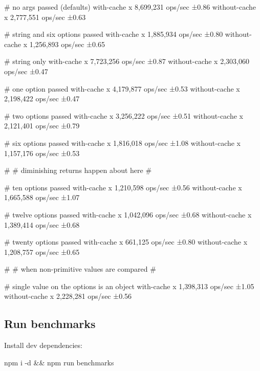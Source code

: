 \begin{DoxyCode}
# no args passed (defaults)
  with-cache x 8,699,231 ops/sec ±0.86%
  without-cache x 2,777,551 ops/sec ±0.63%

# string and six options passed
  with-cache x 1,885,934 ops/sec ±0.80%
  without-cache x 1,256,893 ops/sec ±0.65%

# string only
  with-cache x 7,723,256 ops/sec ±0.87%
  without-cache x 2,303,060 ops/sec ±0.47%

# one option passed
  with-cache x 4,179,877 ops/sec ±0.53%
  without-cache x 2,198,422 ops/sec ±0.47%

# two options passed
  with-cache x 3,256,222 ops/sec ±0.51%
  without-cache x 2,121,401 ops/sec ±0.79%

# six options passed
  with-cache x 1,816,018 ops/sec ±1.08%
  without-cache x 1,157,176 ops/sec ±0.53%

# 
# diminishing returns happen about here
# 

# ten options passed
  with-cache x 1,210,598 ops/sec ±0.56%
  without-cache x 1,665,588 ops/sec ±1.07%

# twelve options passed
  with-cache x 1,042,096 ops/sec ±0.68%
  without-cache x 1,389,414 ops/sec ±0.68%

# twenty options passed
  with-cache x 661,125 ops/sec ±0.80%
  without-cache x 1,208,757 ops/sec ±0.65%

# 
# when non-primitive values are compared
# 

# single value on the options is an object
  with-cache x 1,398,313 ops/sec ±1.05%
  without-cache x 2,228,281 ops/sec ±0.56%
\end{DoxyCode}


\subsection*{Run benchmarks}

Install dev dependencies\+:


\begin{DoxyCode}
npm i -d && npm run benchmarks
\end{DoxyCode}


